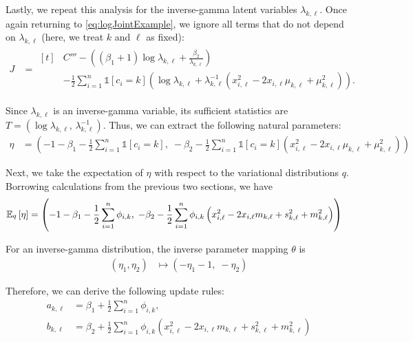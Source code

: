 \documentclass[11pt]{article}
\begin{document}
Lastly, we repeat this analysis for the inverse-gamma latent variables $\lambda_{k,\ell}$.
Once again returning to \eqref{eq:logJointExample}, we ignore all terms that do not depend on $\lambda_{k,\ell}$ (here, we treat $k$ and $\ell$ as fixed):
\begin{align}
J
&= \begin{aligned}[t]
    & C''' - \left((\beta_1 + 1) \log \lambda_{k,\ell} + \frac{\beta_2}{\lambda_{k,\ell}} \right) \\
    & - \frac{1}{2} \sum_{i=1}^n \mathds{1}[c_i = k]
        \left( \log \lambda_{k,\ell} + \lambda_{k,\ell}^{-1} \left( x_{i,\ell}^2 - 2 x_{i,\ell} \mu_{k,\ell} + \mu_{k,\ell}^2 \right) \right).
    \end{aligned}
\end{align}

Since $\lambda_{k,\ell}$ is an inverse-gamma variable, its sufficient statistics are $T = (\log \lambda_{k,\ell}, \, \lambda_{k,\ell}^{-1})$.
Thus, we can extract the following natural parameters:
\begin{align}
\eta
&=
\left(
    -1 - \beta_1 - \frac{1}{2} \sum_{i=1}^n \mathds{1}[c_i=k], \;
    -\beta_2 - \frac{1}{2} \sum_{i=1}^n \mathds{1}[c_i=k] \left( x_{i,\ell}^2 - 2 x_{i,\ell} \mu_{k,\ell} + \mu_{k,\ell}^2 \right)
\right)
\end{align}

Next, we take the expectation of $\eta$ with respect to the variational distributions $q$.
Borrowing calculations from the previous two sections, we have
\begin{align}
\mathbb{E}_{\substack{q}}\left[ \eta \right]
&=
\left(
    -1 - \beta_1 - \frac{1}{2} \sum_{i=1}^n \phi_{i,k}, \;
    -\beta_2 - \frac{1}{2} \sum_{i=1}^n \phi_{i,k}
        \left( x_{i,\ell}^2 - 2 x_{i,\ell} m_{k,\ell} + s_{k,\ell}^2 + m_{k,\ell}^2 \right)
\right)
\end{align}

For an inverse-gamma distribution, the inverse parameter mapping $\theta$ is
\begin{align}
(\eta_1, \eta_2)
&\mapsto
\left(
    -\eta_1 - 1, \;
    -\eta_2
\right)
\end{align}

Therefore, we can derive the following update rules:
\begin{align}
\label{eq:exVarUpdateA}
a_{k,\ell}
&= \beta_1 + \frac{1}{2} \sum_{i=1}^n \phi_{i,k}, \\
\label{eq:exVarUpdateB}
b_{k,\ell}
&= \beta_2 + \frac{1}{2} \sum_{i=1}^n \phi_{i,k}
    \left( x_{i,\ell}^2 - 2 x_{i,\ell} m_{k,\ell} + s_{k,\ell}^2 + m_{k,\ell}^2 \right)
\end{align}
\end{document}
